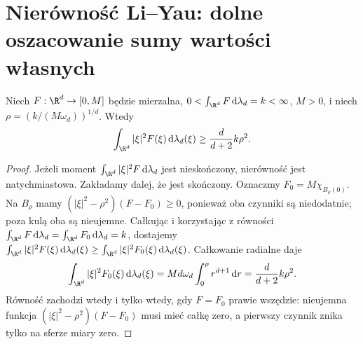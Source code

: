 \section{Nierówność Li--Yau: dolne oszacowanie sumy wartości własnych}
\label{sec:pde18-liyau}
\begin{lemat}
\label{lem:pde18-bathtub}
Niech $F:\R^d\to[0,M]$ będzie mierzalna,
$0<\int_{\R^d}F\,\mathrm d\lambda_d=k<\infty$,
$M>0$, i niech $\rho=(k/(M\omega_d))^{1/d}$.
Wtedy
\begin{equation}\label{eq:pde18-bathtub}
 \int_{\R^d}|\xi|^2F(\xi)\,\mathrm d\lambda_d(\xi)
 \ge\frac{d}{d+2}k\rho^2.
\end{equation}
\end{lemat}
\begin{proof}
Jeżeli moment $\int_{\R^d}|\xi|^2F\,\mathrm d\lambda_d$
jest nieskończony, nierówność jest natychmiastowa.
Zakładamy dalej, że jest skończony.
Oznaczmy $F_0=M\chi_{B_\rho(0)}$.
Na $B_\rho$ mamy $(|\xi|^2-\rho^2)(F-F_0)\ge0$,
ponieważ oba czynniki są niedodatnie; poza kulą oba są
nieujemne. Całkując i korzystając z równości
$\int_{\R^d}F\,\mathrm d\lambda_d=\int_{\R^d}F_0\,\mathrm d\lambda_d=k$, dostajemy
$\int_{\R^d}|\xi|^2F(\xi)\,\mathrm d\lambda_d(\xi)\ge\int_{\R^d}|\xi|^2F_0(\xi)\,\mathrm d\lambda_d(\xi)$.
Całkowanie radialne daje
\[
 \int_{\R^d}|\xi|^2F_0(\xi)\,\mathrm d\lambda_d(\xi)
 =Md\omega_d\int_0^\rho r^{d+1}\,\mathrm dr
 =\frac{d}{d+2}k\rho^2.
\]
Równość zachodzi wtedy i tylko wtedy, gdy $F=F_0$
prawie wszędzie: nieujemna funkcja
$(|\xi|^2-\rho^2)(F-F_0)$ musi mieć całkę zero,
a pierwszy czynnik znika tylko na sferze miary zero.
\end{proof}

